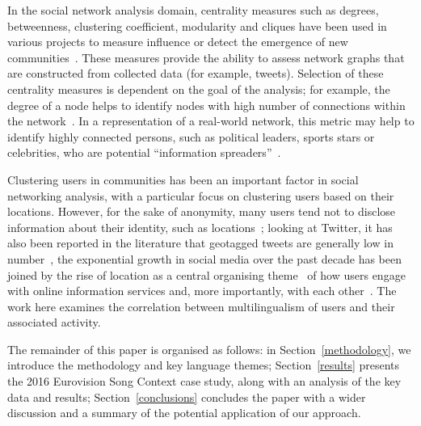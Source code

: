 \documentclass{llncs}
\begin{document}
In the social network analysis domain, centrality measures such as
degrees, betweenness, clustering coefficient, modularity and cliques
have been used in various projects to measure influence or detect the
emergence of new
communities~\cite{willis-et-al:2015,oatley+crick:2015}.  These
measures provide the ability to assess network graphs that are
constructed from collected data (for example, tweets). Selection of
these centrality measures is dependent on the goal of the analysis;
for example, the degree of a node helps to identify nodes with high
number of connections within the
network~\cite{borgatti+everett:2000,rombach-et-al:2014,liu-et-al:2014}.
In a representation of a real-world network, this metric may help to
identify highly connected persons, such as political leaders, sports
stars or celebrities, who are potential ``information
spreaders''~\cite{cha-et-al:2012,borge-holthoefer-et-al:2012,zhang-et-al:2016}.

Clustering users in communities has been an important factor in social
networking analysis, with a particular focus on clustering users
based on their locations. However, for the sake of anonymity, many
users tend not to disclose information about their identity, such as
locations~\cite{kang-et-al:2013}; looking at Twitter, it has also been
reported in the literature that geotagged tweets are generally low in
number~\cite{morstatter-et-al:2013,tan-et-al:2013,kumar-et-al:2014},
the exponential growth in social media over the past decade has been
joined by the rise of location as a central organising
theme~\cite{liang-et-al:2013} of how users engage with online
information services and, more importantly, with each
other~\cite{cheng-et-al:2010,blamey-et-al-2013,caverlee-et-al:2013}. The work here
examines the correlation between multilingualism of users and their
associated activity.


The remainder of this paper is organised as follows: in
Section~\ref{methodology}, we introduce the methodology and key
language themes; Section~\ref{results} presents the 2016 Eurovision
Song Context case study, along with an analysis of the key data and
results; Section~\ref{conclusions} concludes the paper with a wider
discussion and a summary of the potential application of our approach.
\end{document}

